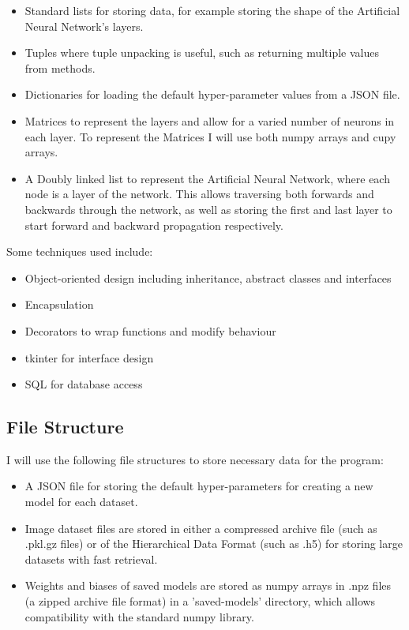 \documentclass[./project-report/src/latex/project-report.tex]{subfiles}
\begin{document}
\begin{itemize}
    \item Standard lists for storing data, for example storing the shape of the Artificial Neural Network's layers.
    \item Tuples where tuple unpacking is useful, such as returning multiple values from methods.
    \item Dictionaries for loading the default hyper-parameter values from a JSON file.
    \item Matrices to represent the layers and allow for a varied number of neurons in each layer. To represent the Matrices I will use both numpy arrays and cupy 
          arrays.
    \item A Doubly linked list to represent the Artificial Neural Network, where each node is a layer of the network. This allows traversing both forwards and 
          backwards through the network, as well as storing the first and last layer to start forward and backward propagation respectively.
\end{itemize}

Some techniques used include:

\begin{itemize}
    \item Object-oriented design including inheritance, abstract classes and interfaces
    \item Encapsulation
    \item Decorators to wrap functions and modify behaviour
    \item tkinter for interface design
    \item SQL for database access
\end{itemize}

\subsection{File Structure}

I will use the following file structures to store necessary data for the program:

\begin{itemize}
    \item A JSON file for storing the default hyper-parameters for creating a new model for each dataset.
	\item Image dataset files are stored in either a compressed archive file (such as .pkl.gz files) or of the Hierarchical Data Format (such as .h5) for storing large 
		  datasets with fast retrieval.
	\item Weights and biases of saved models are stored as numpy arrays in .npz files (a zipped archive file format) in a 'saved-models' directory, which allows compatibility 
		  with the standard numpy library.
\end{itemize}
\end{document}
